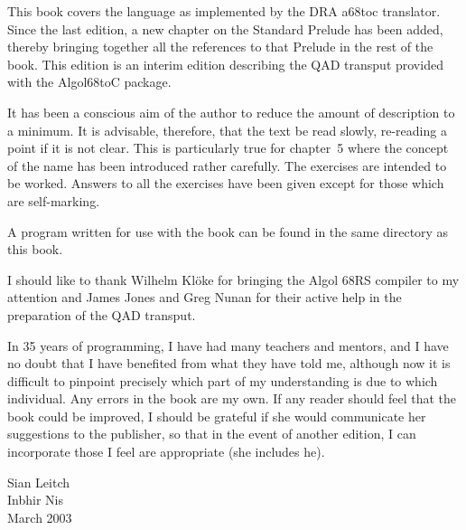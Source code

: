 This book covers the language as implemented by the DRA a68toc
translator.  Since the last edition, a new chapter on the Standard
Prelude has been added, thereby bringing together all the references
to that Prelude in the rest of the book. This edition is an interim
edition describing the QAD transput provided with the Algol68toC package.

It has been a conscious aim of the author to reduce the amount of
description to a minimum.  It is advisable, therefore, that the text be
read slowly, re-reading a point if it is not clear.  This is
particularly true for chapter~5 where the concept of the name has been
introduced rather carefully. The exercises are intended to be worked. 
Answers to all the exercises have been given except for those which are
self-marking.

A program written for use with the book can be found in the same
directory as this book.

I should like to thank Wilhelm Kl\"oke for bringing the Algol 68RS
compiler to my attention and James Jones and Greg Nunan for their
active help in the preparation of the QAD transput.

In 35 years of programming, I have had many teachers and mentors, and I
have no doubt that I have benefited from what they have told me,
although now it is difficult to pinpoint precisely which part of my
understanding is due to which individual. Any errors in the book are my
own.  If any reader should feel that the book could be improved, I
should be grateful if she would communicate her suggestions to the
publisher, so that in the event of another edition, I can incorporate
those I feel are appropriate (she includes he).
\bigskip\bigskip
\begin{flushright}
Sian Leitch\\
Inbhir Nis\\
March 2003
\end{flushright}
